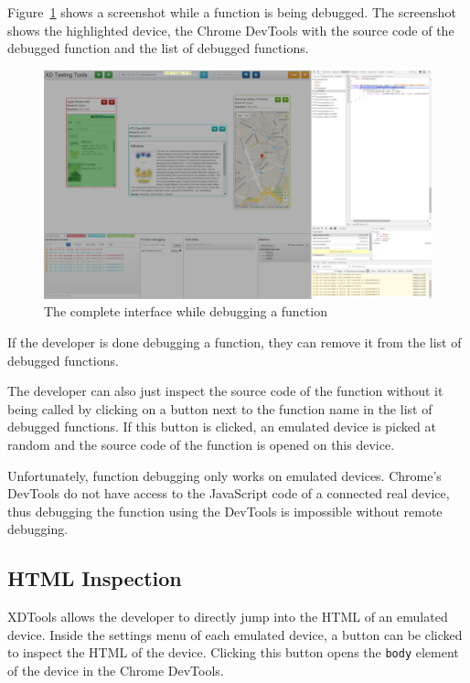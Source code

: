 Figure~\ref{fig:function_debugging_complete} shows a screenshot while a function is being debugged. The screenshot shows the highlighted device, the Chrome DevTools with the source code of the debugged function and the list of debugged functions.

\begin{figure}[H]
  \centering
    \includegraphics[width=1.0\textwidth]{images/screenshots/function_debugging_complete.png}
	\caption[Screenshot: Function debugging]{The complete interface while debugging a function}
	\label{fig:function_debugging_complete}
\end{figure}

If the developer is done debugging a function, they can remove it from the list of debugged functions.

The developer can also just inspect the source code of the function without it being called by clicking on a button next to the function name in the list of debugged functions. If this button is clicked, an emulated device is picked at random and the source code of the function is opened on this device. 

Unfortunately, function debugging only works on emulated devices. Chrome's DevTools do not have access to the JavaScript code of a connected real device, thus debugging the function using the DevTools is impossible without remote debugging.

\subsection{HTML Inspection}

XDTools allows the developer to directly jump into the HTML of an emulated device. Inside the settings menu of each emulated device, a button can be clicked to inspect the HTML of the device. Clicking this button opens the \lstinline|body| element of the device in the Chrome DevTools. 

